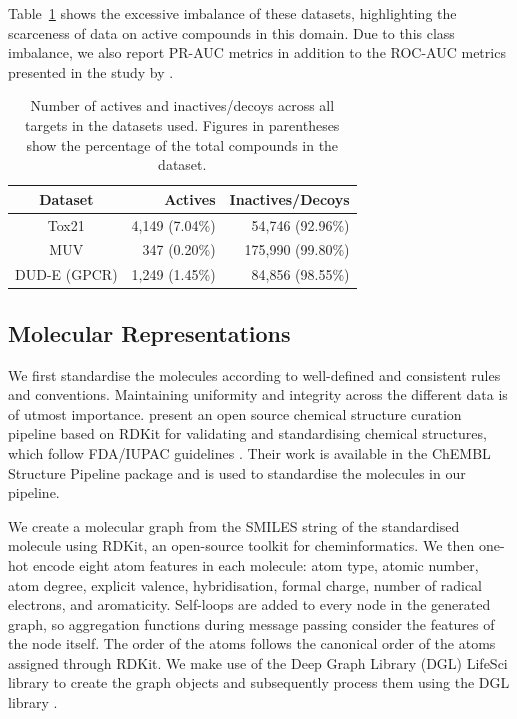 Table~\ref{table:datasetimbalance} shows the excessive imbalance of these datasets, highlighting the scarceness of data on active compounds in this domain. Due to this class imbalance, we also report PR-AUC metrics in addition to the ROC-AUC metrics presented in the study by \citet{altae2017low}.

\begin{table}[h]
    \centering
    \caption{Number of actives and inactives/decoys across all targets in the datasets used. Figures in parentheses show the percentage of the total compounds in the dataset.}
    \begin{tabular}{@{}crr@{}}
        \hline
        Dataset         & Actives           & Inactives/Decoys \\
        \hline
        Tox21           & 4,149 (7.04\%)    & 54,746 (92.96\%) \\
        MUV             & 347 (0.20\%)      & 175,990 (99.80\%) \\
        DUD-E (GPCR)    & 1,249 (1.45\%)    & 84,856 (98.55\%) \\
        \hline              
    \end{tabular}
    \label{table:datasetimbalance}
\end{table}

\subsection{Molecular Representations}

We first standardise the molecules according to well-defined and consistent rules and conventions. Maintaining uniformity and integrity across the different data is of utmost importance. \citet{bento2020open} present an open source chemical structure curation pipeline based on RDKit\citep{rdkit} for validating and standardising chemical structures, which follow FDA/IUPAC guidelines \citep{brecher2006graphical, food2007substance}. Their work is available in the ChEMBL Structure Pipeline package \citep{bento2020open} and is used to standardise the molecules in our pipeline. 

We create a molecular graph from the SMILES string of the standardised molecule using RDKit, an open-source toolkit for cheminformatics. We then one-hot encode eight atom features in each molecule: atom type, atomic number, atom degree, explicit valence, hybridisation, formal charge, number of radical electrons, and aromaticity. Self-loops are added to every node in the generated graph, so aggregation functions during message passing consider the features of the node itself. The order of the atoms follows the canonical order of the atoms assigned through RDKit. We make use of the Deep Graph Library (DGL) LifeSci \cite{dgllife} library to create the graph objects and subsequently process them using the DGL library \cite{wang2019dgl}.

